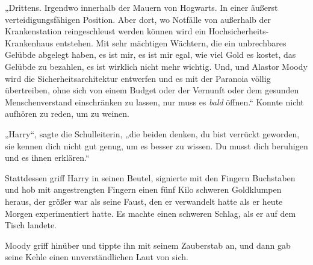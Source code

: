 „Drittens. Irgendwo innerhalb der Mauern von Hogwarts. In einer äußerst verteidigungsfähigen Position. Aber dort, wo Notfälle von außerhalb der Krankenstation reingeschleust werden können wird ein Hochsicherheits-Krankenhaus entstehen. Mit sehr mächtigen Wächtern, die ein unbrechbares Gelübde abgelegt haben, es ist mir, es ist mir egal, wie viel Gold es kostet, das Gelübde zu bezahlen, es ist wirklich nicht mehr wichtig. Und, und Alastor Moody wird die Sicherheitsarchitektur entwerfen und es mit der Paranoia völlig übertreiben, ohne sich von einem Budget oder der Vernunft oder dem gesunden Menschenverstand einschränken zu lassen, nur muss es \emph{bald} öffnen.“ Konnte nicht aufhören zu reden, um zu weinen.

„Harry“, sagte die Schulleiterin, „die beiden denken, du bist verrückt geworden, sie kennen dich nicht gut genug, um es besser zu wissen. Du musst dich beruhigen und es ihnen erklären.“

Stattdessen griff Harry in seinen Beutel, signierte mit den Fingern Buchstaben und hob mit angestrengten Fingern einen fünf Kilo schweren Goldklumpen heraus, der größer war als seine Faust, den er verwandelt hatte als er heute Morgen experimentiert hatte. Es machte einen schweren Schlag, als er auf dem Tisch landete.

Moody griff hinüber und tippte ihn mit seinem Zauberstab an, und dann gab seine Kehle einen unverständlichen Laut von sich.

